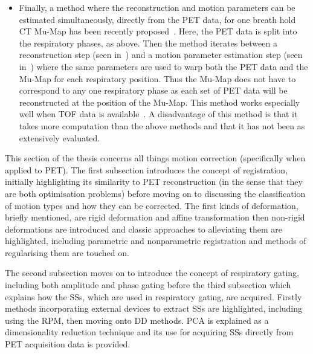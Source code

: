 \begin{itemize}
                \item Finally, a method where the reconstruction and motion parameters can be estimated simultaneously, directly from the \gls{PET} data, for one breath hold \gls{CT} \gls{Mu-Map} has been recently proposed~\parencite{JacobsonFesslerMotionCorrectionBib, Rezaei2018, Bousse2016a}. Here, the \gls{PET} data is split into the respiratory phases, as above. Then the method iterates between a reconstruction step (seen in~) and a motion parameter estimation step (seen in~) where the same parameters are used to warp both the \gls{PET} data and the \gls{Mu-Map} for each respiratory position. Thus the \gls{Mu-Map} does not have to correspond to any one respiratory phase as each set of \gls{PET} data will be reconstructed at the position of the \gls{Mu-Map}. This method works especially well when \gls{TOF} data is available~\parencite{Bousse2016}. A disadvantage of this method is that it takes more computation than the above methods and that it has not been as extensively evaluated.
            \end{itemize}
    
        This section of the thesis concerns all things motion correction (specifically when applied to \gls{PET}). The first subsection introduces the concept of registration, initially highlighting its similarity to \gls{PET} reconstruction (in the sense that they are both optimisation problems) before moving on to discussing the classification of motion types and how they can be corrected. The first kinds of deformation, briefly mentioned, are rigid deformation and affine transformation then non-rigid deformations are introduced and classic approaches to alleviating them are highlighted, including parametric and nonparametric registration and methods of regularising them are touched on.
        
        The second subsection moves on to introduce the concept of respiratory gating, including both amplitude and phase gating before the third subsection which explains how the \glspl{SS}, which are used in respiratory gating, are acquired. Firstly methods incorporating external devices to extract \glspl{SS} are highlighted, including using the \gls{RPM}, then moving onto \gls{DD} methods. \gls{PCA} is explained as a dimensionality reduction technique and its use for acquiring \glspl{SS} directly from \gls{PET} acquisition data is provided.
        
